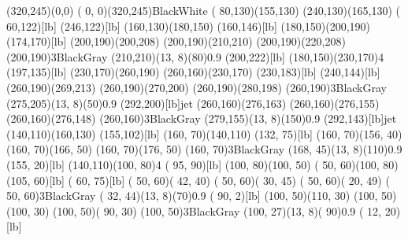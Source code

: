 %
\begin{axopicture}(320,245)(0,0)
%
 \CBox( 0, 0)(320,245){Black}{White}
 \PSTextScalesLikeGraphicsfalse
%
 \LongArrow( 80,130)(155,130)
 \LongArrow(240,130)(165,130)
 \Text( 60,122)[lb]{\Black{\Pp}}
 \Text(246,122)[lb]{\Black{\Pp}}
%
 \ArrowLine(160,130)(180,150)
 \Text(160,146)[lb]{\Blue{\Pqt}}
%
 \ArrowLine(180,150)(200,190)
 \Text(174,170)[lb]{\Blue{\Pqb}}
%
 \Line(200,190)(200,208)
 \Line(200,190)(210,210)
 \Line(200,190)(220,208)
 \CCirc(200,190){3}{Black}{Gray}
 \GOval(210,210)(13, 8)(80){0.9}
 \Text(200,222)[lb]{}
%
 \DashLine(180,150)(230,170){4}
 \Text(197,135)[lb]{\Magenta{\PWp}}
%
 \ArrowLine(230,170)(260,190)
 \ArrowLine(260,160)(230,170)
 \Text(230,183)[lb]{\Blue{\Pq}}
 \Text(240,144)[lb]{\Blue{\Pq}}
%
 \Line(260,190)(269,213)
 \Line(260,190)(270,200)
 \Line(260,190)(280,198)
 \CCirc(260,190){3}{Black}{Gray}
 \GOval(275,205)(13, 8)(50){0.9}
 \Text(292,200)[lb]{\scriptsize jet}
%
 \Line(260,160)(276,163)
 \Line(260,160)(276,155)
 \Line(260,160)(276,148)
 \CCirc(260,160){3}{Black}{Gray}
 \GOval(279,155)(13, 8)(150){0.9}
 \Text(292,143)[lb]{\scriptsize jet}
%
%
 \ArrowLine(140,110)(160,130)
 \Text(155,102)[lb]{\Blue{\Paqt}}
%
 \ArrowLine(160, 70)(140,110)
 \Text(132, 75)[lb]{\Blue{\Paqb}}
%
 \Line(160, 70)(156, 40)
 \Line(160, 70)(166, 50)
 \Line(160, 70)(176, 50)
 \CCirc(160, 70){3}{Black}{Gray}
 \GOval(168, 45)(13, 8)(110){0.9}
 \Text(155, 20)[lb]{}
%
 \DashLine(140,110)(100, 80){4}
 \Text( 95, 90)[lb]{\Magenta{\PWm}}
%
 \ArrowLine(100, 80)(100, 50)
 \ArrowLine( 50, 60)(100, 80)
 \Text(105, 60)[lb]{\Blue{\Pq}}
 \Text( 60, 75)[lb]{\Blue{\Pq}}
%
 \Line( 50, 60)( 42, 40)
 \Line( 50, 60)( 30, 45)
 \Line( 50, 60)( 20, 49)
 \CCirc( 50, 60){3}{Black}{Gray}
 \GOval( 32, 44)(13, 8)(70){0.9}
 \Text( 90,  2)[lb]{}
%
 \Line(100, 50)(110, 30)
 \Line(100, 50)(100, 30)
 \Line(100, 50)( 90, 30)
 \CCirc(100, 50){3}{Black}{Gray}
 \GOval(100, 27)(13, 8)( 90){0.9}
 \Text( 12, 20)[lb]{}
%
\end{axopicture}
